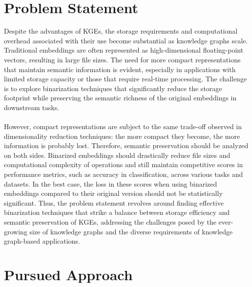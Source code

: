 \documentclass[11pt,titlepage,oneside,openany]{book}
\begin{document}
\section{Problem Statement}

Despite the advantages of KGEs, the storage requirements and computational overhead associated with their use become substantial as knowledge graphs scale. Traditional embeddings are often represented as high-dimensional floating-point vectors, resulting in large file sizes. The need for more compact representations that maintain semantic information is evident, especially in applications with limited storage capacity or those that require real-time processing. The challenge is to explore binarization techniques that significantly reduce the storage footprint while preserving the semantic richness of the original embeddings in downstream tasks.\\
\\
However, compact representations are subject to the same trade-off observed in dimensionality reduction techniques: the more compact they become, the more information is probably lost. Therefore, semantic preservation should be analyzed on both sides. Binarized embeddings should drastically reduce file sizes and computational complexity of operations and still maintain competitive scores in performance metrics, such as accuracy in classification, across various tasks and datasets. In the best case, the loss in these scores when using binarized embeddings compared to their original version should not be statistically significant. Thus, the problem statement revolves around finding effective binarization techniques that strike a balance between storage efficiency and semantic preservation of KGEs, addressing the challenges posed by the ever-growing size of knowledge graphs and the diverse requirements of knowledge graph-based applications.

\section{Pursued Approach}
\end{document}
